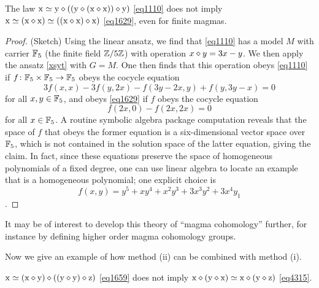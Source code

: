\begin{proposition}\label{1110-1629} The law $\mathrm{x} \simeq \mathrm{y} \diamond ((\mathrm{y} \diamond (\mathrm{x} \diamond \mathrm{x})) \diamond \mathrm{y})$ \eqref{eq1110} does not imply $\mathrm{x} \simeq (\mathrm{x} \diamond \mathrm{x}) \simeq ((\mathrm{x} \diamond \mathrm{x}) \diamond \mathrm{x})$ \eqref{eq1629}, even for finite magmas.
\end{proposition}

\begin{proof}  (Sketch) Using the linear ansatz, we find that \eqref{eq1110} has a model $M$ with carrier $\mathbb{F}_5$ (the finite field $\mathbb{Z}/5\mathbb{Z}$) with operation $x \diamond y = 3x-y$.  We then apply the ansatz \eqref{xsyt} with $G=M$.  One then finds that this operation obeys \eqref{eq1110} if $f \colon \mathbb{F}_5 \times \mathbb{F}_5 \to \mathbb{F}_5$ obeys the cocycle equation
  $$3f(x,x) - 3f(y,2x) - f(3y-2x,y) + f(y,3y-x) = 0$$
for all $x,y \in \mathbb{F}_5$, and obeys \eqref{eq1629} if $f$ obeys the cocycle equation
$$ f(2x,0) - f(2x,2x) = 0$$
for all $x \in \mathbb{F}_5$.  A routine symbolic algebra package computation reveals that the space of $f$ that obeys the former equation is a six-dimensional vector space over $\mathbb{F}_5$, which is not contained in the solution space of the latter equation, giving the claim.
In fact, since these equations preserve the space of homogeneous polynomials of a fixed degree, one can use linear algebra to locate an example that is a homogeneous polynomial; one explicit choice is $$f(x,y) = y^5 +xy^4 + x^2y^3 +3x^3 y^2 + 3x^4 y_1$$.
\end{proof}

It may be of interest to develop this theory of ``magma cohomology'' further, for instance by defining higher order magma cohomology groups.

Now we give an example of how method (ii) can be combined with method (i).

\begin{proposition}\label{1659-4315} $\mathrm{x} \simeq (\mathrm{x} \diamond \mathrm{y}) \diamond ((\mathrm{y} \diamond \mathrm{y}) \diamond \mathrm{z})$ \eqref{eq1659} does not imply $\mathrm{x} \diamond (\mathrm{y} \diamond \mathrm{x}) \simeq \mathrm{x} \diamond (\mathrm{y} \diamond \mathrm{z})$ \eqref{eq4315}.
\end{proposition}

